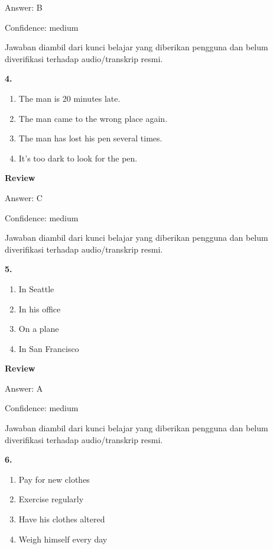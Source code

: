 \documentclass[12pt]{article}
\begin{document}
Answer: B\par
Confidence: medium\par
Jawaban diambil dari kunci belajar yang diberikan pengguna dan belum diverifikasi terhadap audio/transkrip resmi.\par
\endgroup
\par
\vspace{0.25\baselineskip}
\noindent\textbf{4.}
\begin{enumerate}[label=(\Alph*),leftmargin=*,itemsep=0.2em]
\item The man is 20 minutes late.
\item The man came to the wrong place again.
\item The man has lost his pen several times.
\item It's too dark to look for the pen.
\end{enumerate}
\par
\begingroup
\setlength{\parskip}{0pt}
\setlength{\parindent}{0pt}
\textbf{Review}\par
Answer: C\par
Confidence: medium\par
Jawaban diambil dari kunci belajar yang diberikan pengguna dan belum diverifikasi terhadap audio/transkrip resmi.\par
\endgroup
\par
\vspace{0.25\baselineskip}
\noindent\textbf{5.}
\begin{enumerate}[label=(\Alph*),leftmargin=*,itemsep=0.2em]
\item In Seattle
\item In his office
\item On a plane
\item In San Francisco
\end{enumerate}
\par
\begingroup
\setlength{\parskip}{0pt}
\setlength{\parindent}{0pt}
\textbf{Review}\par
Answer: A\par
Confidence: medium\par
Jawaban diambil dari kunci belajar yang diberikan pengguna dan belum diverifikasi terhadap audio/transkrip resmi.\par
\endgroup
\par
\vspace{0.25\baselineskip}
\noindent\textbf{6.}
\begin{enumerate}[label=(\Alph*),leftmargin=*,itemsep=0.2em]
\item Pay for new clothes
\item Exercise regularly
\item Have his clothes altered
\item Weigh himself every day
\end{enumerate}
\end{document}
